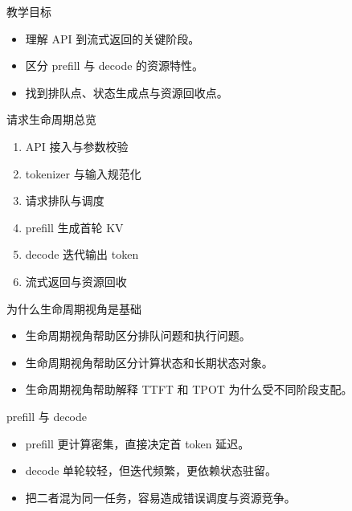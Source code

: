 




\begin{frame}[plain]
  \titlepage
\end{frame}

\begin{frame}{教学目标}
  \begin{itemize}
    \item 理解 API 到流式返回的关键阶段。
    \item 区分 prefill 与 decode 的资源特性。
    \item 找到排队点、状态生成点与资源回收点。
  \end{itemize}
\end{frame}

\begin{frame}{请求生命周期总览}
  \begin{enumerate}
    \item API 接入与参数校验
    \item tokenizer 与输入规范化
    \item 请求排队与调度
    \item prefill 生成首轮 KV
    \item decode 迭代输出 token
    \item 流式返回与资源回收
  \end{enumerate}
\end{frame}

\begin{frame}{为什么生命周期视角是基础}
  \begin{itemize}
    \item 生命周期视角帮助区分排队问题和执行问题。
    \item 生命周期视角帮助区分计算状态和长期状态对象。
    \item 生命周期视角帮助解释 TTFT 和 TPOT 为什么受不同阶段支配。
  \end{itemize}
\end{frame}

\begin{frame}{prefill 与 decode}
  \begin{itemize}
    \item prefill 更计算密集，直接决定首 token 延迟。
    \item decode 单轮较轻，但迭代频繁，更依赖状态驻留。
    \item 把二者混为同一任务，容易造成错误调度与资源竞争。
  \end{itemize}
\end{frame}

